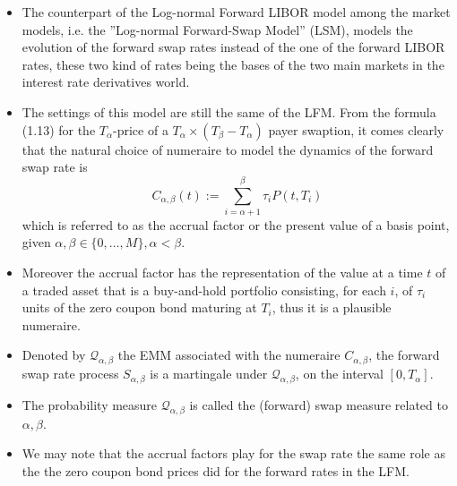 \documentclass{beamer}
\begin{document}
\begin{frame}
  \begin{itemize}
  \item The counterpart of the Log-normal Forward LIBOR model among the market models, i.e. the ”Log-normal Forward-Swap Model” (LSM), models the evolution of the forward swap rates instead of the one of the forward LIBOR rates, these two kind of rates being the bases of the two main markets in the interest rate derivatives world. 
  \item The settings of this model are still the same of the LFM.
    From the formula (1.13) for the $T_\alpha$-price of a $T_\alpha\times(T_\beta-T_\alpha)$ payer swaption, it comes clearly that the natural choice of numeraire to model the dynamics
    of the forward swap rate is
    \begin{equation}
      C_{\alpha,\beta}(t) := \sum^\beta_{i=\alpha+1}\tau_i P(t, T_i)
    \end{equation}
    which is referred to as the accrual factor or the present value of a basis point, given $\alpha, \beta \in \{0,\ldots, M\}, \alpha < \beta$. 
  \end{itemize}
\end{frame}

\begin{frame}
  \begin{itemize}
  \item Moreover the accrual factor has the representation of the value at a time $t$ of a traded asset that is a buy-and-hold portfolio consisting, for each $i$, of $\tau_i$ units of the zero coupon bond maturing at $T_i$, thus it is a plausible numeraire.
  \item Denoted by $\mathcal{Q}_{\alpha,\beta}$ the EMM associated with the numeraire $C_{\alpha,\beta}$, the forward swap rate process $S_{\alpha,\beta}$ is a martingale under $\mathcal{Q}_{\alpha,\beta}$, on the interval $[0, T_\alpha]$.
  \item The probability measure $\mathcal{Q}_{\alpha,\beta}$ is called the (forward) swap measure related to $\alpha, \beta$.
  \item We may note that the accrual factors play for the swap rate the same role as the the zero coupon bond prices did for the forward rates in the LFM. 
  \end{itemize}
\end{frame}
\end{document}
